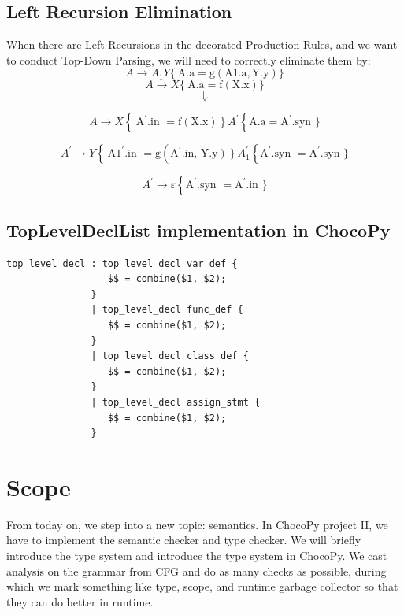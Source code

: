 \documentclass[a4paper]{exam}
\begin{document}
\subsection{Left Recursion Elimination}
When there are Left Recursions in the decorated Production Rules, and we want to conduct Top-Down Parsing, we will need to correctly eliminate them by:
$$A \rightarrow A_{1} Y\{\mathrm{~A} . \mathrm{a}=\mathrm{g}(\mathrm{A} 1 . \mathrm{a}, \mathrm{Y} . \mathrm{y})\}$$
$$A \rightarrow X\{\mathrm{~A} . \mathrm{a}=\mathrm{f}(\mathrm{X} . \mathrm{x})\}$$
$$\Downarrow$$

$$A \rightarrow X\left\{\mathrm{~A}^{\prime} .\right. \text{in }\left.=\mathrm{f}(\mathrm{X} . \mathrm{x})\right\} A^{\prime}\left\{\mathrm{A} . \mathrm{a}=\mathrm{A}^{\prime} .\right.\text{syn }\}$$

$$A^{\prime} \rightarrow Y\left\{\mathrm{~A} 1^{\prime} .\right.\text{in }=\mathrm{g}\left(\mathrm{A}^{\prime} .\right.\text{in, }\left.\left.\mathrm{Y} . \mathrm{y}\right)\right\} A_{1}^{\prime}\left\{\mathrm{A}^{\prime} .\right.\text{syn }=\mathrm{A}^{\prime} .\text{syn }\}$$

$$A^{\prime} \rightarrow \varepsilon\left\{\mathrm{A}^{\prime} .\right.\text{syn }=\mathrm{A}^{\prime} .\text{in }\}$$

\subsection{TopLevelDeclList implementation in ChocoPy}
\begin{verbatim}
top_level_decl : top_level_decl var_def {
                  $$ = combine($1, $2);
               }
               | top_level_decl func_def {
                  $$ = combine($1, $2);
               }
               | top_level_decl class_def {
                  $$ = combine($1, $2);
               }
               | top_level_decl assign_stmt {
                  $$ = combine($1, $2);
               }
\end{verbatim}

\section{Scope}
From today on, we step into a new topic: semantics. In ChocoPy project II, we have to implement the semantic checker and type checker. We will briefly introduce the type system and introduce the type system in ChocoPy. We cast analysis on the grammar from CFG and do as many checks as possible, during which we mark something like type, scope, and runtime garbage collector so that they can do better in runtime.
\end{document}

